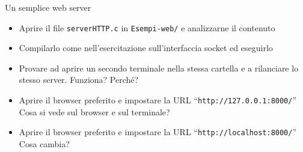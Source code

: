 \documentclass[11pt]{article}
\begin{document}
\begin{tcolorbox}[colback=blue!5!white,colframe=blue!75!black,title=\textbf{DOMANDA}, breakable]
Un semplice web server
\begin{itemize}
    \item Aprire il file \texttt{serverHTTP.c} in \texttt{Esempi-web/} e analizzarne il contenuto
    \item Compilarlo come nell'esercitazione sull'interfaccia socket ed eseguirlo
    \item Provare ad aprire un secondo terminale nella stessa cartella e a rilanciare lo stesso server. Funziona? Perché?
    \item Aprire il browser preferito e impostare la URL ``\texttt{http://127.0.0.1:8000/}'' Cosa si vede sul browser e sul terminale?
    \item Aprire il browser preferito e impostare la URL ``\texttt{http://localhost:8000/}'' Cosa cambia?
\end{itemize}
\end{tcolorbox}
\end{document}
